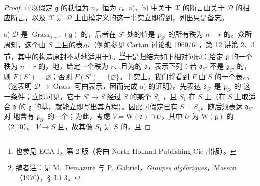 \begin{proof}
可以假定 $\mathfrak g$ 的秩恒为 $n$，恒为 $r$。a)、b) 中关于 $\mathcal X$ 的断言由关于 $\mathcal D$ 的相应断言，以及 $\mathcal X$ 是 $\mathcal D$ 上由模定义的这一事实立即得到，列出只是备忘。

a)  $\mathcal D$ 是 $\operatorname{Grass}_{n-r}(\mathfrak g)$ 的，后者在 $S'$ 处的值是 $\mathfrak g_{S'}$ 的所有秩为 $n-r$ 的。众所周知，这个由 $S$ 上且的表示（例如参见 Cartan 讨论班 1960/61，第 12 讲第 2、3 节，其中的构造原封不动地适用于）。\footnote{也参见 EGA I，第 2 版（将由 North Holland Publishing Cie 出版）。}\footnote{编者注：见 M.~Demazure 与 P.~Gabriel，\emph{Groupes algébriques}，Masson（1970），\S~I.1.3。}于是归结为如下相对问题：给定 $\mathfrak g$ 的一个秩为 $n-r$ 的，地，给定一个秩为 $r$、且为的 $\mathfrak d$，表示下列：若 $\mathfrak d_{S'}$ 不是 $\mathfrak g_{S'}$ 的，则 $F(S')=\varnothing$；否则 $F(S')=\{\varnothing\}$。事实上，我们将看到 $F$ 由 $S$ 的一个表示（这表明 $\mathcal D\to\operatorname{Grass}$ 可由表示，因而完成 a) 的证明）。先表达 $\mathfrak d_{S'}$ 是 $\mathfrak g_{S'}$ 的 这一条件；立即可见，它于 $S'\to S$ 经过 $S$ 的某个 $S_1$ ，且 $S_1$ 在 $S$ 上（在 $S$ 上取适合 $\mathfrak d$ 的 $\mathfrak g$ 的基，就能立即写出其方程）。因此可假定已有 $S=S_1$。随后须表达 $\mathfrak d_{S'}$ 对 地含有 $\mathfrak g_{S'}$ 的一个；为此，考虑 $V=\mathrm W(\mathfrak d)\cap U$，其中 $U$ 为 $\mathrm W(\mathfrak g)$ 的（2.10）。 $V\to S$ 且，故其像 $S_1$ 是 $S$ 的，且

\end{proof}
